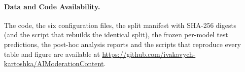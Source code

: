 \paragraph*{Data and Code Availability.}
The code, the six configuration files, the split manifest with SHA-256 digests
(and the script that rebuilds the identical split), the frozen per-model test
predictions, the post-hoc analysis reports and the scripts that reproduce every
table and figure are available at
\url{https://github.com/ivakavych-kartoshka/AIModerationContent}.
